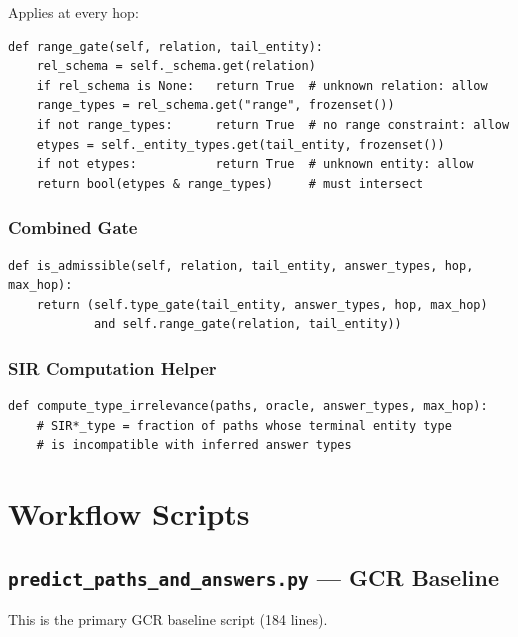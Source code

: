 \documentclass[11pt,a4paper,oneside,openany]{book}
\theoremstyle{definition}
\begin{document}
Applies at every hop:

\begin{lstlisting}
def range_gate(self, relation, tail_entity):
    rel_schema = self._schema.get(relation)
    if rel_schema is None:   return True  # unknown relation: allow
    range_types = rel_schema.get("range", frozenset())
    if not range_types:      return True  # no range constraint: allow
    etypes = self._entity_types.get(tail_entity, frozenset())
    if not etypes:           return True  # unknown entity: allow
    return bool(etypes & range_types)     # must intersect
\end{lstlisting}

\subsection{Combined Gate}

\begin{lstlisting}
def is_admissible(self, relation, tail_entity, answer_types, hop, max_hop):
    return (self.type_gate(tail_entity, answer_types, hop, max_hop)
            and self.range_gate(relation, tail_entity))
\end{lstlisting}

\subsection{SIR Computation Helper}

\begin{lstlisting}
def compute_type_irrelevance(paths, oracle, answer_types, max_hop):
    # SIR*_type = fraction of paths whose terminal entity type
    # is incompatible with inferred answer types
\end{lstlisting}

\chapter{Workflow Scripts}\label{ch:workflow}

\section{\texttt{predict\_paths\_and\_answers.py} --- GCR Baseline}

This is the primary GCR baseline script (184 lines).
\end{document}
